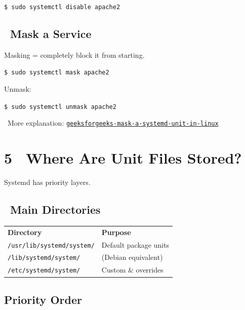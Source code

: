 \documentclass[12pt]{article}
\newcommand{\arrowicon}{\faArrowRight}
\begin{document}
\begin{highlightbox}
\texttt{\$ sudo systemctl disable apache2}
\end{highlightbox}

\subsection*{\faSkull\ Mask a Service}

Masking = completely block it from starting.

\begin{highlightbox}
\texttt{\$ sudo systemctl mask apache2}
\end{highlightbox}

Unmask:

\begin{highlightbox}
\texttt{\$ sudo systemctl unmask apache2}
\end{highlightbox}

\begin{infobox}
\arrowicon\ More explanation: \href{https://www.geeksforgeeks.org/linux-unix/how-to-mask-a-systemd-unit-in-linux/}{\texttt{geeksforgeeks-mask-a-systemd-unit-in-linux}}
\end{infobox}

\section*{5 \faFolderOpen\ Where Are Unit Files Stored?}

Systemd has priority layers.

\subsection*{\faDatabase\ Main Directories}

\begin{infobox}
\begin{tabular}{ll}
\textbf{Directory} & \textbf{Purpose} \\
\texttt{/usr/lib/systemd/system/} & Default package units \\
\texttt{/lib/systemd/system/} & (Debian equivalent) \\
\texttt{/etc/systemd/system/} & Custom \& overrides \\
\end{tabular}
\end{infobox}

\subsection*{Priority Order}
\end{document}
